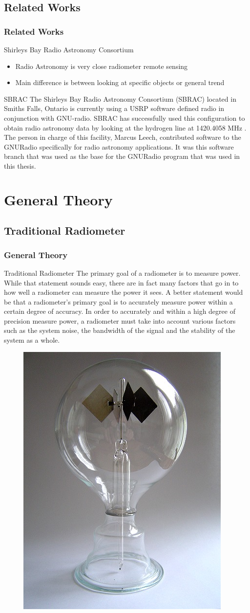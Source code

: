 \documentclass{beamer}
\begin{document}
\subsection{Related Works}
\begin{frame}
\frametitle{Related Works}
\begin{block}{Shirleys Bay Radio Astronomy Consortium}
\begin{itemize}
\item Radio Astronomy is very close radiometer remote sensing
\item Main difference is between looking at specific objects or general trend
\end{itemize}
\end{block}
\pause
\begin{block}{SBRAC}
The Shirleys Bay Radio Astronomy Consortium (SBRAC) located in Smiths Falls, Ontario is currently using a USRP software defined radio in conjunction with GNU-radio.  SBRAC has successfully used this configuration to obtain radio astronomy data by looking at the hydrogen line at 1420.4058 MHz \cite{Leech2007}.  The person in charge of this facility, Marcus Leech, contributed software to the GNURadio specifically for radio astronomy applications.  It was this software branch that was used as the base for the GNURadio program that was used in this thesis.
\end{block}
\end{frame}
\section{General Theory}
\subsection{Traditional Radiometer}
\begin{frame}
\frametitle{General Theory}
\begin{block}{Traditional Radiometer}
The primary goal of a radiometer is to measure power.  While that statement sounds easy, there are in fact many factors that go in to how well a radiometer can measure the power it sees.  A better statement would be that a radiometer's primary goal is to accurately measure power within a certain degree of accuracy.  In order to accurately and within a high degree of precision measure power, a radiometer must take into account various factors such as the system noise, the bandwidth of the signal and the stability of the system as a whole. 
\end{block}

\begin{figure}\label{crookes}
\includegraphics[width=0.15\linewidth]{images/Crookes_radiometer.jpg}
\end{figure}
\end{frame}
\end{document}
